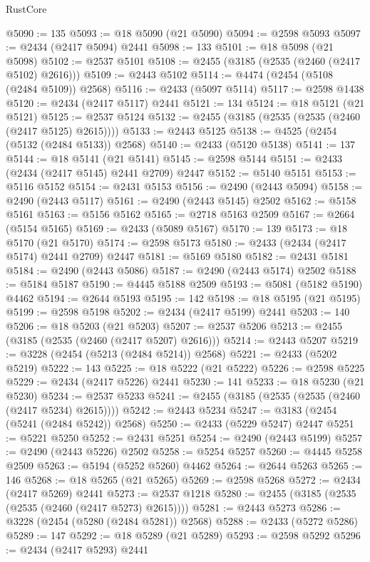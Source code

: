 \begin{lexlean}{RustCore}
\begin{coremodule}
@5090 := 135
@5093 := @18 @5090 (@21 @5090)
@5094 := @2598 @5093
@5097 := @2434 (@2417 @5094) @2441
@5098 := 133
@5101 := @18 @5098 (@21 @5098)
@5102 := @2537 @5101
@5108 := @2455 (@3185 (@2535 (@2460 (@2417 @5102) @2616)))
@5109 := @2443 @5102
@5114 := @4474 (@2454 (@5108 (@2484 @5109)) @2568)
@5116 := @2433 (@5097 @5114)
@5117 := @2598 @1438
@5120 := @2434 (@2417 @5117) @2441
@5121 := 134
@5124 := @18 @5121 (@21 @5121)
@5125 := @2537 @5124
@5132 := @2455 (@3185 (@2535 (@2535 (@2460 (@2417 @5125) @2615))))
@5133 := @2443 @5125
@5138 := @4525 (@2454 (@5132 (@2484 @5133)) @2568)
@5140 := @2433 (@5120 @5138)
@5141 := 137
@5144 := @18 @5141 (@21 @5141)
@5145 := @2598 @5144
@5151 := @2433 (@2434 (@2417 @5145) @2441 @2709) @2447
@5152 := @5140 @5151
@5153 := @5116 @5152
@5154 := @2431 @5153
@5156 := @2490 (@2443 @5094)
@5158 := @2490 (@2443 @5117)
@5161 := @2490 (@2443 @5145) @2502
@5162 := @5158 @5161
@5163 := @5156 @5162
@5165 := @2718 @5163 @2509
@5167 := @2664 (@5154 @5165)
@5169 := @2433 (@5089 @5167)
@5170 := 139
@5173 := @18 @5170 (@21 @5170)
@5174 := @2598 @5173
@5180 := @2433 (@2434 (@2417 @5174) @2441 @2709) @2447
@5181 := @5169 @5180
@5182 := @2431 @5181
@5184 := @2490 (@2443 @5086)
@5187 := @2490 (@2443 @5174) @2502
@5188 := @5184 @5187
@5190 := @4445 @5188 @2509
@5193 := @5081 (@5182 @5190) @4462
@5194 := @2644 @5193
@5195 := 142
@5198 := @18 @5195 (@21 @5195)
@5199 := @2598 @5198
@5202 := @2434 (@2417 @5199) @2441
@5203 := 140
@5206 := @18 @5203 (@21 @5203)
@5207 := @2537 @5206
@5213 := @2455 (@3185 (@2535 (@2460 (@2417 @5207) @2616)))
@5214 := @2443 @5207
@5219 := @3228 (@2454 (@5213 (@2484 @5214)) @2568)
@5221 := @2433 (@5202 @5219)
@5222 := 143
@5225 := @18 @5222 (@21 @5222)
@5226 := @2598 @5225
@5229 := @2434 (@2417 @5226) @2441
@5230 := 141
@5233 := @18 @5230 (@21 @5230)
@5234 := @2537 @5233
@5241 := @2455 (@3185 (@2535 (@2535 (@2460 (@2417 @5234) @2615))))
@5242 := @2443 @5234
@5247 := @3183 (@2454 (@5241 (@2484 @5242)) @2568)
@5250 := @2433 (@5229 @5247) @2447
@5251 := @5221 @5250
@5252 := @2431 @5251
@5254 := @2490 (@2443 @5199)
@5257 := @2490 (@2443 @5226) @2502
@5258 := @5254 @5257
@5260 := @4445 @5258 @2509
@5263 := @5194 (@5252 @5260) @4462
@5264 := @2644 @5263
@5265 := 146
@5268 := @18 @5265 (@21 @5265)
@5269 := @2598 @5268
@5272 := @2434 (@2417 @5269) @2441
@5273 := @2537 @1218
@5280 := @2455 (@3185 (@2535 (@2535 (@2460 (@2417 @5273) @2615))))
@5281 := @2443 @5273
@5286 := @3228 (@2454 (@5280 (@2484 @5281)) @2568)
@5288 := @2433 (@5272 @5286)
@5289 := 147
@5292 := @18 @5289 (@21 @5289)
@5293 := @2598 @5292
@5296 := @2434 (@2417 @5293) @2441

\end{coremodule}
\end{lexlean}
